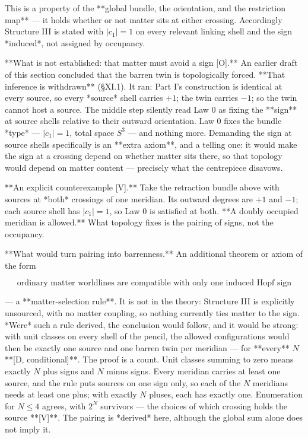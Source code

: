 This is a property of the **global bundle, the orientation, and the restriction map** — it holds whether or not matter sits at either crossing. Accordingly Structure III is stated with $|c_1| = 1$ on every relevant linking shell and the sign *induced*, not assigned by occupancy.

**What is not established: that matter must avoid a sign [O].** An earlier draft of this section concluded that the barren twin is topologically forced. **That inference is withdrawn** (§XI.1). It ran: Part I's construction is identical at every source, so every *source* shell carries $+1$; the twin carries $-1$; so the twin cannot host a source. The middle step silently read Law 0 as fixing the **sign** at source shells relative to their outward orientation. Law 0 fixes the bundle *type* — $|c_1| = 1$, total space $S^3$ — and nothing more. Demanding the sign at source shells specifically is an **extra axiom**, and a telling one: it would make the sign at a crossing depend on whether matter sits there, so that topology would depend on matter content — precisely what the centrepiece disavows.

**An explicit counterexample [V].** Take the retraction bundle above with sources at *both* crossings of one meridian. Its outward degrees are $+1$ and $-1$; each source shell has $|c_1| = 1$, so Law 0 is satisfied at both. **A doubly occupied meridian is allowed.** What topology fixes is the pairing of signs, not the occupancy.

**What would turn pairing into barrenness.** An additional theorem or axiom of the form

$$\text{ordinary matter worldlines are compatible with only one induced Hopf sign}$$

— a **matter-selection rule**. It is not in the theory: Structure III is explicitly unsourced, with no matter coupling, so nothing currently ties matter to the sign. *Were* such a rule derived, the conclusion would follow, and it would be strong: with unit classes on every shell of the pencil, the allowed configurations would then be exactly one source and one barren twin per meridian — for **every** $N$ **[D, conditional]**. The proof is a count. Unit classes summing to zero means exactly $N$ plus signs and $N$ minus signs. Every meridian carries at least one source, and the rule puts sources on one sign only, so each of the $N$ meridians needs at least one plus; with exactly $N$ pluses, each has exactly one. Enumeration for $N\leq4$ agrees, with $2^N$ survivors — the choices of which crossing holds the source **[V]**. The pairing is *derived* here, although the global sum alone does not imply it.


